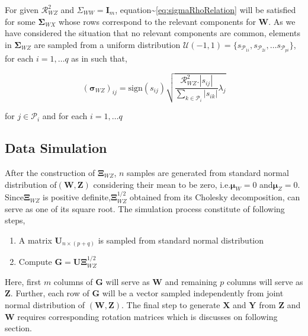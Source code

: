 \documentclass[12pt,a4paperpaper,authoryear]{elsarticle} %
\providecommand{\tightlist}{%
  \setlength{\itemsep}{0pt}\setlength{\parskip}{0pt}}
\begin{document}
For given \(\boldsymbol{\mathcal{R}}_{WZ}^{2}\) and
\(\Sigma_{WW} = \mathbf{I}_m\),
equation\textasciitilde{}\eqref{eq:sigmaRhoRelation} will be satisfied for
some \(\boldsymbol{\Sigma}_{WX}\) whose rows correspond to the relevant
components for \(\mathbf{W}\). As we have considered the situation that
no relevant components are common, elements in
\(\boldsymbol{\Sigma}_{WZ}\) are sampled from a uniform distribution
\(\mathcal{U}(-1, 1) = \{s_{\mathcal{P}_{1i}}, s_{\mathcal{P}_{2i}}, \ldots s_{\mathcal{P}_{pi}}\}\),
for each \(i = 1, \ldots q\) as in \citet{saebo2015simrel} such that,

\[
\left(\boldsymbol{\sigma}_{WZ}\right)_{ij} = \text{sign}\left(s_{ij}\right)
\sqrt{
  \frac
    {\boldsymbol{\mathcal{R}}_{WZ}^{2}.\left|s_{ij}\right|}
    {\sum_{k\in\mathcal{P}_i}{\left|s_{ik}\right|}}
  \lambda_{j}
}
\]

for \(j \in \mathcal{P}_i\) and for each \(i = 1, \ldots q\)

\subsection{Data Simulation}\label{data-simulation}

After the construction of \(\boldsymbol{\Xi}_{WZ}\), \(n\) samples are
generated from standard normal distribution
of\(\left(\mathbf{W}, \mathbf{Z} \right)\) considering their mean to be
zero, i.e.\(\boldsymbol{\mu}_W = 0\) and\(\boldsymbol{\mu}_Z=0\).
Since\(\boldsymbol{\Xi}_{WZ}\) is positive
definite,\(\boldsymbol{\Xi}_{WZ}^{1/2}\) obtained from its Cholesky
decomposition, can serve as one of its square root. The simulation
process constitute of following steps,

\begin{enumerate}
\def\labelenumi{\arabic{enumi})}
\tightlist
\item
  A matrix \(\mathbf{U}_{n\times (p + q)}\) is sampled from standard
  normal distribution
\item
  Compute \(\mathbf{G} = \boldsymbol{U\Xi}_{WZ}^{1/2}\)
\end{enumerate}

Here, first \(m\) columns of \(\mathbf{G}\) will serve as \(\mathbf{W}\)
and remaining \(p\) columns will serve as \(\mathbf{Z}\). Further, each
row of \(\mathbf{G}\) will be a vector sampled independently from joint
normal distribution of \(\left(\mathbf{W}, \mathbf{Z}\right)\). The
final step to generate \(\mathbf{X}\) and \(\mathbf{Y}\) from
\(\mathbf{Z}\) and \(\mathbf{W}\) requires corresponding rotation
matrices which is discusses on following section.
\end{document}

